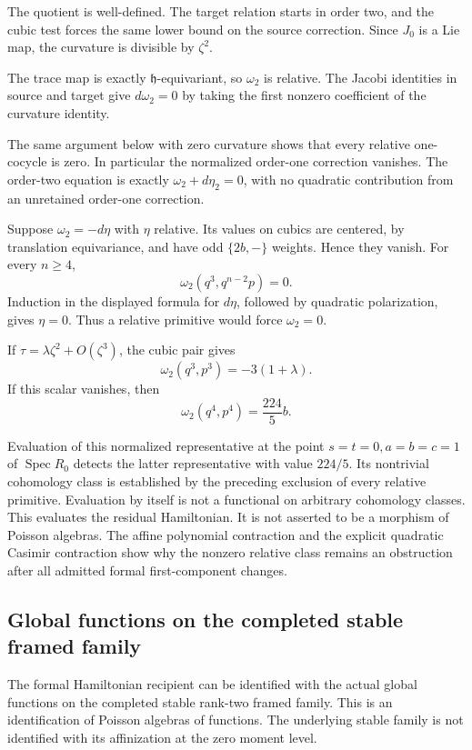 The quotient is well-defined. The target relation starts in order two,
and the cubic test forces the same lower bound on the source correction.
Since $J_0$ is a Lie map, the curvature is divisible by $\zeta^2$.

The trace map is exactly $\mathfrak h$-equivariant, so $\omega_2$
is relative. The Jacobi identities in source and target give
$d\omega_2=0$ by taking the first nonzero coefficient of the
curvature identity.

The same argument below with zero curvature shows that every relative
one-cocycle is zero. In particular the normalized order-one correction
vanishes. The order-two equation is exactly $\omega_2+d\eta_2=0$,
with no quadratic contribution from an unretained order-one correction.

Suppose $\omega_2=-d\eta$ with $\eta$ relative. Its values on
cubics are centered, by translation equivariance, and have odd
$\{2b,-\}$ weights. Hence they vanish. For every $n\ge4$,
\[
 \omega_2(q^3,q^{n-2}p)=0.
\]
Induction in the displayed formula for $d\eta$, followed by
quadratic polarization, gives $\eta=0$. Thus a relative primitive
would force $\omega_2=0$.

If $\tau=\lambda\zeta^2+O(\zeta^3)$, the cubic pair gives
\[
 \omega_2(q^3,p^3)=-3(1+\lambda).
\]
If this scalar vanishes, then
\[
 \omega_2(q^4,p^4)=\frac{224}{5}b.
\]

Evaluation of this normalized representative at the point
$s=t=0,a=b=c=1$ of $\operatorname{Spec}R_0$ detects the latter
representative with value $224/5$. Its nontrivial cohomology class is established by the preceding exclusion of every relative primitive. Evaluation by itself is not a functional on arbitrary cohomology classes. This evaluates the residual Hamiltonian. It is not asserted to be a morphism of Poisson algebras.
The affine polynomial contraction and the explicit quadratic
Casimir contraction show why the nonzero relative class remains
an obstruction after all admitted formal first-component changes.

\subsection{Global functions on the completed stable framed family}
\label{mht:frgl:sec:geometric-formal-recipient}

The formal Hamiltonian recipient can be identified with the actual
global functions on the completed stable rank-two framed family.
This is an identification of Poisson algebras of functions. The
underlying stable family is not identified with its affinization
at the zero moment level.

